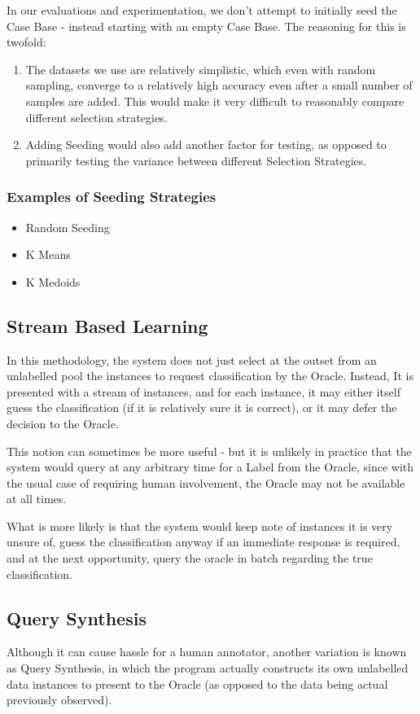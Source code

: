 \documentclass[a4paper,11pt]{report}
\begin{document}
In our evaluations and experimentation, we don't attempt to initially seed the Case Base - instead starting with an empty Case Base. The reasoning for this is twofold: 
\begin{enumerate}
	\item The datasets we use are relatively simplistic, which even with random sampling, converge to a relatively high accuracy even after a small number of samples are added. This would make it very difficult to reasonably compare different selection strategies. 
	\item Adding Seeding would also add another factor for testing, as opposed to primarily testing the variance between different Selection Strategies.
\end{enumerate}

\subsubsection{Examples of Seeding Strategies}
\begin{itemize}
	\item Random Seeding
	\item K Means
	\item K Medoids
\end{itemize}

\subsection{Stream Based Learning}
In this methodology, the system does not just select at the outset from an unlabelled pool the instances to request classification by the Oracle. Instead, It is presented with a stream of instances, and for each instance, it may either itself guess the classification (if it is relatively sure it is correct), or it may defer the decision to the Oracle.

This notion can sometimes be more useful - but it is unlikely in practice that the system would query at any arbitrary time for a Label from the Oracle, since with the usual case of requiring human involvement, the Oracle may not be available at all times.

What is more likely is that the system would keep note of instances it is very unsure of, guess the classification anyway if an immediate response is required, and at the next opportunity, query the oracle in batch regarding the true classification.

\subsection{Query Synthesis}
Although it can cause hassle for a human annotator, another variation is known as Query Synthesis, in which the program actually constructs its own unlabelled data instances to present to the Oracle (as opposed to the data being actual previously observed).
\end{document}

